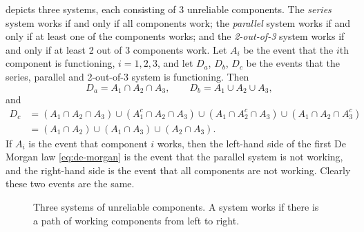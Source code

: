 \begin{example}\label{ex:system-reliability-events}
 depicts three systems, each consisting of 3 unreliable components. The \emph{series} system works if and only if all components work; the \emph{parallel} system works if and only if at least one of the components works; and the \emph{2-out-of-3} system works if and only if at least 2 out of 3 components work. Let $A_i$ be the event that the $i$th component is functioning, $i = 1, 2, 3$, and let $D_a$, $D_b$, $D_c$ be the events that the series, parallel and 2-out-of-3 system is functioning. Then
\[
  D_a = A_1 \cap A_2 \cap A_3, \qquad D_b = A_1 \cup A_2 \cup A_3,
\]
and
\begin{align*}
  D_c &= (A_1 \cap A_2 \cap A_3) \cup (A_1^c \cap A_2 \cap A_3) \cup (A_1 \cap A_2^c \cap A_3) \cup (A_1 \cap A_2 \cap A_3^c) \\
      &= (A_1 \cap A_2) \cup (A_1 \cap A_3) \cup (A_2 \cap A_3).
\end{align*}
If $A_i$ is the event that component $i$ works, then the left-hand side of the first De Morgan law \eqref{eq:de-morgan} is the event that the parallel system is not working, and the right-hand side is the event that all components are not working. Clearly these two events are the same.
\end{example}

\begin{figure}[ht]
\centering
{}
\caption{Three systems of unreliable components. A system works if there is a path of working components from left to right.}
\label{fig:three-systems}
\end{figure}

